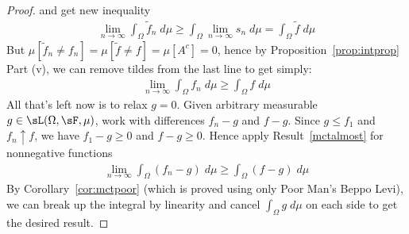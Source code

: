 \documentclass[12pt]{article}
\theoremstyle{plain}
\theoremstyle{definition}
\theoremstyle{remark}
\newcommand{\limn}{\lim_{n\rightarrow\infty}}
\begin{document}
\begin{proof}
and get new inequality
\begin{align*}
  \limn \int_\Omega \tilde{f}_n\;d\mu
  \geq
  \int_\Omega \limn s_n\;d\mu
  = \int_\Omega \tilde{f}\;d\mu
\end{align*}
But $\mu[\tilde{f}_n\neq f_n]=\mu[\tilde{f}\neq f]=\mu[A^c]=0$, hence by
Proposition~\ref{prop:intprop} Part (v), we can remove tildes from
the last line to get simply:
\begin{align}
  \limn \int_\Omega f_n\;d\mu
  \geq \int_\Omega f\;d\mu
  \label{mctalmost}
\end{align}
All that's left now is to relax $g=0$.
Given arbitrary measurable $g\in\sL(\Omega,\sF,\mu)$,
work with differences $f_n-g$ and $f-g$.
Since $g\leq f_1$ and $f_n\uparrow f$, we have $f_1-g\geq 0$ and
$f-g\geq 0$. Hence apply Result~\ref{mctalmost} for nonnegative
functions
\begin{align*}
  \limn \int_\Omega (f_n-g)\;d\mu
  \geq \int_\Omega (f-g)\;d\mu
\end{align*}
By Corollary~\ref{cor:mctpoor} (which is proved using only Poor Man's
Beppo Levi), we can break up the integral by linearity and cancel
$\int_\Omega g\;d\mu$ on each side to get the desired result.
\end{proof}
\end{document}

